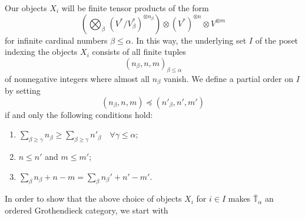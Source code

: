 \documentclass[11pt]{article}
\renewcommand{\labelenumi}{(\arabic{enumi})}
\theoremstyle{plain}
\theoremstyle{nonumberplain}
\theoremstyle{plain}
\theoremstyle{nonumberplain}
\newcommand\bT{\mathbb T}
\begin{document}
Our objects $X_i$ will be {finite} tensor products of the form
\begin{equation}\label{eq:xi}
  { \left(\bigotimes_{\beta} \,\left(V^*/V^*_{\beta}\right)^{\otimes n_\beta}\right)\otimes (V^*)^{\otimes n}\otimes V^{\otimes m}}
\end{equation}
for infinite cardinal numbers $\beta\le\alpha$.  {In this way,} the
underlying set $I$ of the poset indexing the objects $X_i$ consists of
all finite tuples
\begin{equation*}
  (n_\beta,n,{m})_{\beta\le \alpha}
\end{equation*}
of nonnegative integers where almost all $n_\beta$ vanish.  We define a partial order on $I$ by setting
\begin{equation*}
  (n_\beta,n,{m}) {\preceq} (n'_\beta,n',{m'})
\end{equation*}
{if and only the following conditions hold:}
\begin{enumerate}
  \renewcommand{\labelenumi}{(\alph{enumi})}
    \item $\sum\limits_{\beta\geq\gamma} n_\beta \geq \sum\limits_{\beta\geq\gamma} n'_\beta \quad \forall \gamma\leq\alpha$;
    \item $n\le n'$  and {$m\le m'$};
    \item {$\sum_\beta n_\beta+n-m = \sum_\beta n_\beta'+n'-m'$}.
\end{enumerate}



 In order to show that the above choice of objects $X_i$ for $i\in I$ makes $\bar{\bT}_\alpha$ an ordered Grothendieck category, we start with
\end{document}
